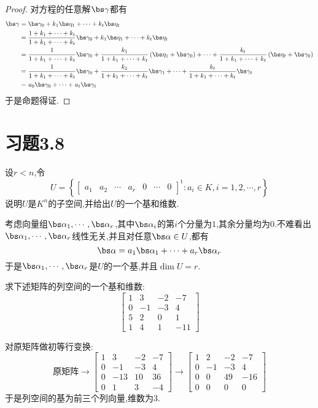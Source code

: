 \documentclass{ctexart}
\begin{document}
\begin{proof}
    对方程的任意解$\bs\gamma$都有
    \[\begin{aligned}
        \bs\gamma
        &= \bs\gamma_0+k_1\bs\eta_1+\cdots+k_t\bs\eta_t \\
        &= \dfrac{1+k_1+\cdots+k_t}{1+k_1+\cdots+k_t}\bs\gamma_0+k_1\bs\eta_1+\cdots+k_t\bs\eta_t \\
        &= \dfrac{1}{1+k_1+\cdots+k_t}\bs\gamma_0+\dfrac{k_1}{1+k_1+\cdots+k_t}\left(\bs\eta_1+\bs\gamma_0\right)+\cdots+\dfrac{k_t}{1+k_1+\cdots+k_t}\left(\bs\eta_t+\bs\gamma_0\right) \\
        &= \dfrac{1}{1+k_1+\cdots+k_t}\bs\gamma_0+\dfrac{k_1}{1+k_1+\cdots+k_t}\bs\gamma_1+\cdots+\dfrac{k_t}{1+k_1+\cdots+k_t}\bs\gamma_t \\
        &= u_0\bs\gamma_0+\cdots+u_t\bs\gamma_t
    \end{aligned}\]
    于是命题得证.
\end{proof}
\section*{习题3.8}
\begin{homework}[1]
    设$r<n$,令
    \[U=\left\{\begin{bmatrix}
        a_1&a_2&\cdots&a_r&0&\cdots&0
    \end{bmatrix}^{\text{t}}:a_i\in K,i=1,2,\cdots,r\right\}\]
    说明$U$是$K^n$的子空间,并给出$U$的一个基和维数.
\end{homework}
\begin{solution}
    考虑向量组$\bs\alpha_1,\cdots,\bs\alpha_r$,其中$\bs\alpha_i$的第$i$个分量为$1$,其余分量均为$0$.不难看出$\bs\alpha_1,\cdots,\bs\alpha_r$线性无关,并且对任意$\bs\alpha\in U$,都有
    \[\bs\alpha=a_1\bs\alpha_1+\cdots+a_r\bs\alpha_r\]
    于是$\bs\alpha_1,\cdots,\bs\alpha_r$是$U$的一个基,并且$\dim U=r$.
\end{solution}
\begin{homework}[4]
    求下述矩阵的列空间的一个基和维数:
    \[\begin{bmatrix}
        1&3&-2&-7\\
        0&-1&-3&4\\
        5&2&0&1\\
        1&4&1&-11
    \end{bmatrix}\]
\end{homework}
\begin{solution}
    对原矩阵做初等行变换:
    \[\text{原矩阵}\longrightarrow\begin{bmatrix}
        1&3&-2&-7\\
        0&-1&-3&4\\
        0&-13&10&36\\
        0&1&3&-4
    \end{bmatrix}\longrightarrow\begin{bmatrix}
        1&2&-2&-7\\
        0&-1&-3&4\\
        0&0&49&-16\\
        0&0&0&0
    \end{bmatrix}\]
    于是列空间的基为前三个列向量,维数为$3$.
\end{solution}
\end{document}
